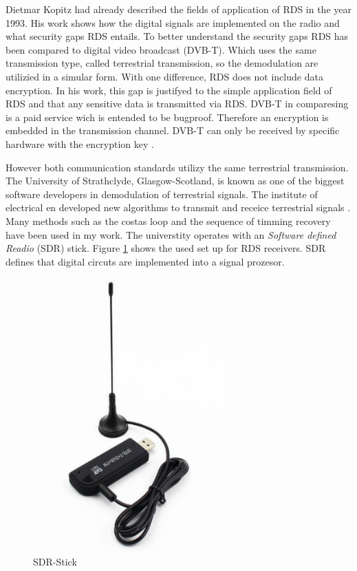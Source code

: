 \documentclass[conference,12pt,a4paper]{IEEEtran}
\begin{document}
	Dietmar Kopitz had already described the fields of application of RDS in the year 1993. His work shows how the digital signals are implemented on the radio and what security gaps RDS entails. To better understand the security gaps RDS has been compared to digital video broadcast (DVB-T). Which uses the same transmission type, called terrestrial transmission, so the demodulation are utilizied in a simular form. With one difference, RDS does not include data encryption. In his work, this gap is justifyed to the simple application field of RDS and that any sensitive data is transmitted via RDS. DVB-T in comparesing is a paid service wich is entended to be bugproof. Therefore an encryption is embedded in the transmission channel. DVB-T can only be received by specific hardware with the encryption key \cite{DietmanRDSbeginning}.
	
	However both communication standards utilizy the same terrestrial transmission. The University of Strathclyde, Glasgow-Scotland, is known as one of the biggest software developers in demodulation of terrestrial signals. The institute of electrical en developed new algorithms to transmit and receice terrestrial signals \cite{stewart2015software}. Many methods such as the costas loop and the sequence of timming recovery have been used in my work. The universtity operates with an \textit{Software defined Readio} (SDR) stick. Figure \ref{fig: receiver} shows the used set up for RDS receivers. SDR defines that digital circuts are implemented into a signal prozesor.
	
	
	\begin{figure}[h]
		\centering
		\includegraphics[scale=1]{img/SDR-Stick}
		\caption{SDR-Stick}
		\label{fig: receiver}
	\end{figure}
	
\end{document}
